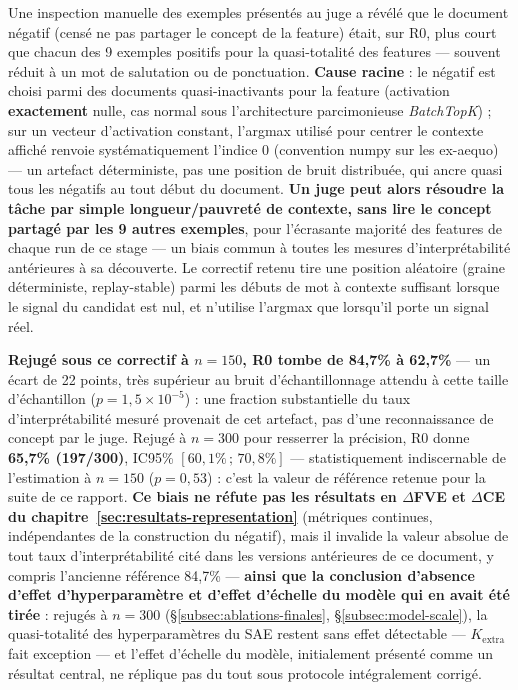 \documentclass[11pt]{article}
\begin{document}
\begin{resultbox}
Une inspection manuelle des exemples présentés au juge a révélé que le
document \og{}négatif\fg{} (censé ne pas partager le concept de la feature)
était, sur R0, plus court que chacun des 9 exemples positifs pour la
quasi-totalité des features --- souvent réduit à un mot de salutation ou de
ponctuation. \textbf{Cause racine} : le négatif est choisi parmi des
documents quasi-inactivants pour la feature (activation \textbf{exactement}
nulle, cas normal sous l'architecture parcimonieuse \emph{BatchTopK}) ; sur
un vecteur d'activation constant, l'argmax utilisé pour centrer le contexte
affiché renvoie systématiquement l'indice 0 (convention numpy sur les
ex-aequo) --- un artefact déterministe, pas une position de bruit distribuée,
qui ancre quasi tous les négatifs au tout début du document. \textbf{Un juge
peut alors résoudre la tâche par simple longueur/pauvreté de contexte, sans
lire le concept partagé par les 9 autres exemples}, pour l'écrasante majorité
des features de chaque run de ce stage --- un biais commun à toutes les
mesures d'interprétabilité antérieures à sa découverte. Le correctif retenu
tire une position aléatoire (graine déterministe, replay-stable) parmi les
débuts de mot à contexte suffisant lorsque le signal du candidat est nul, et
n'utilise l'argmax que lorsqu'il porte un signal réel.

\textbf{Rejugé sous ce correctif à $n=150$, R0 tombe de 84,7\% à 62,7\%} ---
un écart de 22 points, très supérieur au bruit d'échantillonnage attendu à
cette taille d'échantillon ($p=1{,}5\times10^{-5}$) : une fraction
substantielle du taux d'interprétabilité mesuré provenait de cet artefact,
pas d'une reconnaissance de concept par le juge. Rejugé à $n=300$ pour
resserrer la précision, R0 donne \textbf{65,7\% (197/300)}, IC95\%
$[60{,}1\%\,;\,70{,}8\%]$ --- statistiquement indiscernable de l'estimation à
$n=150$ ($p=0{,}53$) : c'est la valeur de référence retenue pour la suite de
ce rapport. \textbf{Ce biais ne réfute pas les résultats en $\Delta$FVE et
$\Delta$CE du chapitre~\ref{sec:resultats-representation}} (métriques
continues, indépendantes de la construction du négatif), mais il invalide la
valeur absolue de tout taux d'interprétabilité cité dans les versions
antérieures de ce document, y compris l'ancienne référence 84,7\% ---
\textbf{ainsi que la conclusion d'absence d'effet d'hyperparamètre et
d'effet d'échelle du modèle qui en avait été tirée} : rejugés à $n=300$
(\S\ref{subsec:ablations-finales}, \S\ref{subsec:model-scale}), la
quasi-totalité des hyperparamètres du SAE restent sans effet détectable ---
$K_\text{extra}$ fait exception --- et l'effet d'échelle du modèle,
initialement présenté comme un résultat central, ne réplique pas du tout
sous protocole intégralement corrigé.
\end{resultbox}
\end{document}
